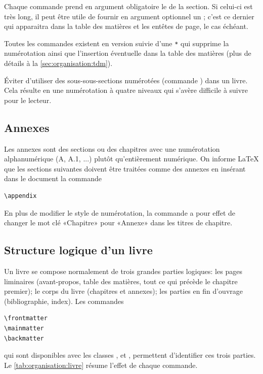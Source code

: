 Chaque commande prend en argument obligatoire le  de la
section. Si celui-ci est très long, il peut être utile de fournir en
argument optionnel un ; c'est ce dernier qui
apparaitra dans la table des matières et les entêtes de page, le cas
échéant.

Toutes les commandes existent en version suivie d'une \verb=*= qui
supprime la numérotation ainsi que l'insertion éventuelle dans la
table des matières (plus de détails à la \autoref{sec:organisation:tdm}).

\begin{conseil}
  Éviter d'utiliser des sous-sous-sections numérotées (commande
  \cmdprint{\subsubsection}) dans un livre. Cela résulte en une
  numérotation à quatre niveaux qui s'avère difficile à suivre pour le
  lecteur.
\end{conseil}

\subsection{Annexes}
\label{sec:organisation:parties:annexes}

Les annexes sont des sections ou des chapitres avec une numérotation
alphanumérique (A, A.1, ...) plutôt qu'entièrement numérique. On
informe {\LaTeX} que les sections suivantes doivent être traitées
comme des annexes en insérant dans le document la commande
\begin{lstlisting}
\appendix
\end{lstlisting}
En plus de modifier le style de numérotation, la commande a pour effet
de changer le mot clé «Chapitre» pour «Annexe» dans les titres de
chapitre.

\subsection{Structure logique d'un livre}
\label{sec:oganisation:parties:livre}

Un livre se compose normalement de trois grandes parties logiques: les
pages liminaires (avant-propos, table des matières, tout ce qui
précède le chapitre premier); le corps du livre (chapitres et
annexes); les parties en fin d'ouvrage (bibliographie, index). Les
commandes
\begin{lstlisting}
\frontmatter
\mainmatter
\backmatter
\end{lstlisting}
qui sont disponibles avec les classes ,  et
, permettent d'identifier ces trois parties. Le
\autoref{tab:organisation:livre} résume l'effet de chaque commande.

